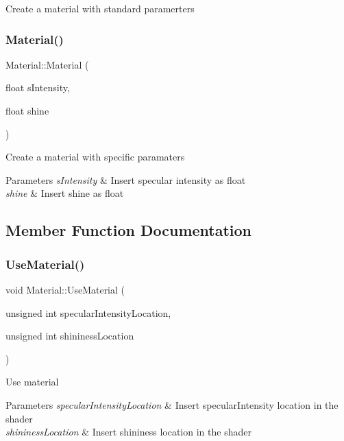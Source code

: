 Create a material with standard paramerters \mbox{\label{class_material_a6e4e2f31f8f1a193607e467e9986672d}} 
\subsubsection{\texorpdfstring{Material()}{Material()}\hspace{0.1cm}{\footnotesize\ttfamily [2/2]}}
{\footnotesize\ttfamily Material\+::\+Material (\begin{DoxyParamCaption}\item[{float}]{s\+Intensity,  }\item[{float}]{shine }\end{DoxyParamCaption})}

Create a material with specific paramaters 
\begin{DoxyParams}{Parameters}
{\em s\+Intensity} & Insert specular intensity as float \\
\hline
{\em shine} & Insert shine as float \\
\hline
\end{DoxyParams}


\subsection{Member Function Documentation}
\mbox{\label{class_material_a3b3ca5e07da7cac545454afd4a7936b9}} 
\subsubsection{\texorpdfstring{UseMaterial()}{UseMaterial()}\hspace{0.1cm}{\footnotesize\ttfamily [1/2]}}
{\footnotesize\ttfamily void Material\+::\+Use\+Material (\begin{DoxyParamCaption}\item[{unsigned int}]{specular\+Intensity\+Location,  }\item[{unsigned int}]{shininess\+Location }\end{DoxyParamCaption})}

Use material 
\begin{DoxyParams}{Parameters}
{\em specular\+Intensity\+Location} & Insert specular\+Intensity location in the shader \\
\hline
{\em shininess\+Location} & Insert shininess location in the shader \\
\hline
\end{DoxyParams}
\mbox{\label{class_material_ae465e6c8c0ed52a5cabc5ccced8f20de}} 
